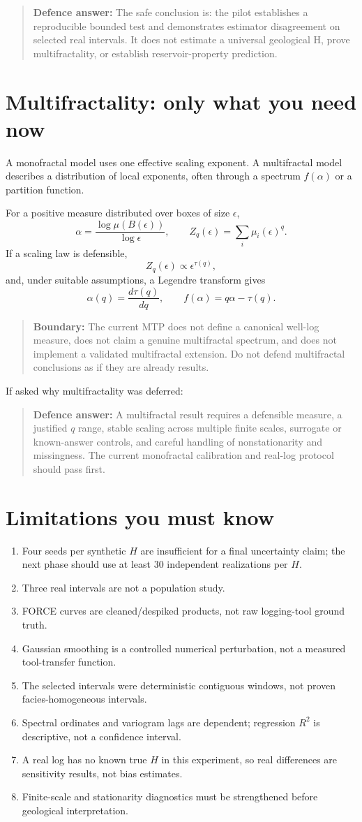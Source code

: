 \documentclass[11pt,a4paper]{article}
\newcommand{\warning}[1]{\begin{quote}\color{Amber}\textbf{Boundary:} #1\end{quote}}
\newcommand{\answer}[1]{\begin{quote}\color{Navy}\textbf{Defence answer:} #1\end{quote}}
\begin{document}
\answer{The safe conclusion is: the pilot establishes a reproducible bounded test and demonstrates estimator disagreement on selected real intervals. It does not estimate a universal geological H, prove multifractality, or establish reservoir-property prediction.}

\section{Multifractality: only what you need now}
A monofractal model uses one effective scaling exponent. A multifractal model describes a distribution of local exponents, often through a spectrum $f(\alpha)$ or a partition function.

For a positive measure distributed over boxes of size $\epsilon$,
\[
\alpha=\frac{\log \mu(B(\epsilon))}{\log\epsilon},
\qquad
Z_q(\epsilon)=\sum_i \mu_i(\epsilon)^q.
\]
If a scaling law is defensible,
\[
Z_q(\epsilon)\propto\epsilon^{\tau(q)},
\]
and, under suitable assumptions, a Legendre transform gives
\[
\alpha(q)=\frac{d\tau(q)}{dq},\qquad f(\alpha)=q\alpha-\tau(q).
\]

\warning{The current MTP does not define a canonical well-log measure, does not claim a genuine multifractal spectrum, and does not implement a validated multifractal extension. Do not defend multifractal conclusions as if they are already results.}

If asked why multifractality was deferred:
\answer{A multifractal result requires a defensible measure, a justified $q$ range, stable scaling across multiple finite scales, surrogate or known-answer controls, and careful handling of nonstationarity and missingness. The current monofractal calibration and real-log protocol should pass first.}

\section{Limitations you must know}
\begin{enumerate}
\item Four seeds per synthetic $H$ are insufficient for a final uncertainty claim; the next phase should use at least 30 independent realizations per $H$.
\item Three real intervals are not a population study.
\item FORCE curves are cleaned/despiked products, not raw logging-tool ground truth.
\item Gaussian smoothing is a controlled numerical perturbation, not a measured tool-transfer function.
\item The selected intervals were deterministic contiguous windows, not proven facies-homogeneous intervals.
\item Spectral ordinates and variogram lags are dependent; regression $R^2$ is descriptive, not a confidence interval.
\item A real log has no known true $H$ in this experiment, so real differences are sensitivity results, not bias estimates.
\item Finite-scale and stationarity diagnostics must be strengthened before geological interpretation.
\end{enumerate}
\end{document}
